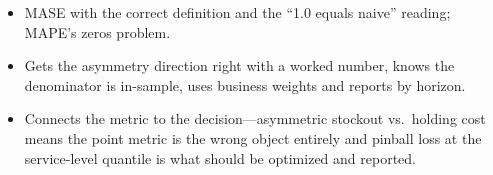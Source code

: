 \begin{interviewq}

\goodgreat
\begin{itemize}
    \item {} MASE with the correct definition and the ``1.0 equals naive'' reading; MAPE's zeros problem.
    \item {} Gets the asymmetry direction right with a worked number, knows the denominator is in-sample, uses business weights and reports by horizon.
    \item {} Connects the metric to the decision---asymmetric stockout vs.\ holding cost means the point metric is the wrong object entirely and pinball loss at the service-level quantile is what should be optimized and reported.
\end{itemize}

\end{interviewq}

